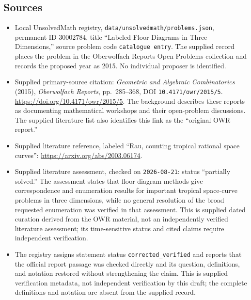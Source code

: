\documentclass[11pt]{article}
\begin{document}
\subsection{Sources}
\begin{itemize}
\item Local UnsolvedMath registry, \texttt{data/unsolvedmath/problems.json}, permanent ID \(30002784\), title ``Labeled Floor Diagrams in Three Dimensions,'' source problem code \texttt{catalogue entry}. The supplied record places the problem in the Oberwolfach Reports Open Problems collection and records the proposed year as 2015. No individual proposer is identified.
\item Supplied primary-source citation: \emph{Geometric and Algebraic Combinatorics} (2015), \emph{Oberwolfach Reports}, pp.\ 285--368, DOI \texttt{10.4171/owr/2015/5}. \url{https://doi.org/10.4171/owr/2015/5}. The background describes these reports as documenting mathematical workshops and their open-problem discussions. The supplied literature list also identifies this link as the ``original OWR report.''
\item Supplied literature reference, labeled ``Rau, counting tropical rational space curves'': \url{https://arxiv.org/abs/2003.06174}.
\item Supplied literature assessment, checked on \texttt{2026-08-21}: status ``partially solved.'' The assessment states that floor-diagram methods give correspondence and enumeration results for important tropical space-curve problems in three dimensions, while no general resolution of the broad requested enumeration was verified in that assessment. This is supplied dated curation derived from the OWR material, not an independently verified literature assessment; its time-sensitive status and cited claims require independent verification.
\item The registry assigns statement status \texttt{corrected\_verified} and reports that the official report passage was checked directly and its question, definitions, and notation restored without strengthening the claim. This is supplied verification metadata, not independent verification by this draft; the complete definitions and notation are absent from the supplied record.
\end{itemize}
\end{document}
